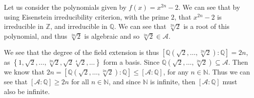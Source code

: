 Let us consider the polynomials given by \(f(x)=x^{2n}-2\). We can see
that by using Eisenstein irreducibility criterion, with the prime \(2\),
that \(x^{2n}-2\) is irreducible in \(\mathbb{Z}\), and irreducible in
\(\mathbb{Q}\). We can see that \(\sqrt[2n]{2}\) is a root of this
polynomial, and thus \(\sqrt[2n]{2}\) is algebraic and so
\(\sqrt[2n]{2}\in\mathcal{A}\).

We see that the degree of the field extension is thus
\([\mathbb{Q}(\sqrt{2},\ldots,\sqrt[2n]{2}):\mathbb{Q}]=2n\), as
\(\left\{1,\sqrt{2},\ldots,\sqrt[2n]{2},\sqrt{2}\sqrt[4]{2},\ldots\right\}\)
form a basis. Since
\(\mathbb{Q}(\sqrt{2},\ldots,\sqrt[2n]{2})\subseteq\mathcal{A}\). Then
we know that
\(2n=[\mathbb{Q}(\sqrt{2},\ldots,\sqrt[2n]{2}):\mathbb{Q}]\leq[\mathcal{A}:\mathbb{Q}]\),
for any \(n\in\mathbb{N}\). Thus we can see that
\([\mathcal{A}:\mathbb{Q}]\geq 2n\) for all \(n\in\mathbb{N}\), and
since \(\mathbb{N}\) is infinite, then \([\mathcal{A}:\mathbb{Q}]\) must
also be infinite.
